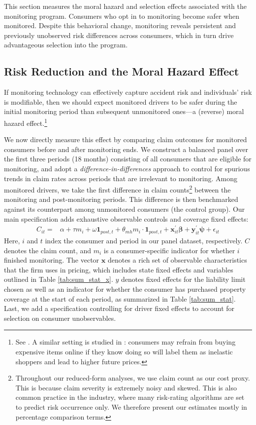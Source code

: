 This section measures the moral hazard and selection effects associated with the monitoring program. Consumers who opt in to monitoring become safer when monitored. Despite this behavioral change, monitoring reveals persistent and previously unobserved risk differences across consumers, which in turn drive advantageous selection into the program.

\subsection{Risk Reduction and the Moral Hazard Effect\label{subsec:rf_incentive}}

If monitoring technology can effectively capture accident risk and individuals' risk is modifiable, then we should expect monitored drivers to be safer during the initial monitoring period than subsequent unmonitored ones---a (reverse) moral hazard effect.\footnote{See \textcite{Fama1980,Holmstrom1999}. A similar setting is studied in \textcite{Taylor2004, Fudenberg2006}: consumers may refrain from buying expensive items online if they know doing so will label them as inelastic shoppers and lead to higher future prices.}

We now directly measure this effect by comparing claim outcomes for monitored consumers before and after monitoring ends.
We construct a balanced panel over the first three periods (18 months) consisting of all consumers that are eligible for monitoring, and adopt a \textit{difference-in-differences} approach to control for spurious trends in claim rates across periods that are irrelevant to monitoring. Among monitored drivers, we take the first difference in claim counts\footnote{Throughout our reduced-form analyses, we use claim count as our cost proxy. This is because claim severity is extremely noisy and skewed. This is also common practice in the industry, where many risk-rating algorithms are set to predict risk occurrence only. We therefore present our estimates mostly in percentage comparison terms.} between the monitoring and post-monitoring periods. This difference is then benchmarked against its counterpart among unmonitored consumers (the control group). Our main specification adds exhaustive observable controls and coverage fixed effects:
\begin{align}
C_{it}= & \alpha+\tau m_{i}+\omega\mathbf{1}_{post,t}+\theta_{mh}m_{i}\cdot\mathbf{1}_{post,t}+\mathbf{x}_{it}^{\prime}\mathbf{\beta}+\mathbf{y}_{it}^{\prime}\mathbf{\psi}+\epsilon_{it}\label{eq:mh_reg}
\end{align}
Here, $i$ and $t$ index the consumer and period in our panel dataset, respectively. $C$ denotes the claim count, and $m_i$ is a consumer-specific indicator for whether $i$ finished monitoring. The vector $\mathbf{x}$ denotes a rich set of observable characteristics that the firm uses in pricing, which includes state fixed effects and variables outlined in Table \ref{tab:sum_stat_x}. $y$ denotes fixed effects for the liability limit chosen as well as an indicator for whether the consumer has purchased property coverage at the start of each period, as summarized in Table \ref{tab:sum_stat}.
Last, we add a specification controlling for driver fixed effects to account for selection on consumer unobservables.

